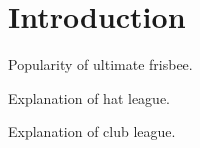 \section{Introduction}

Popularity of ultimate frisbee.

Explanation of hat league.

Explanation of club league.

